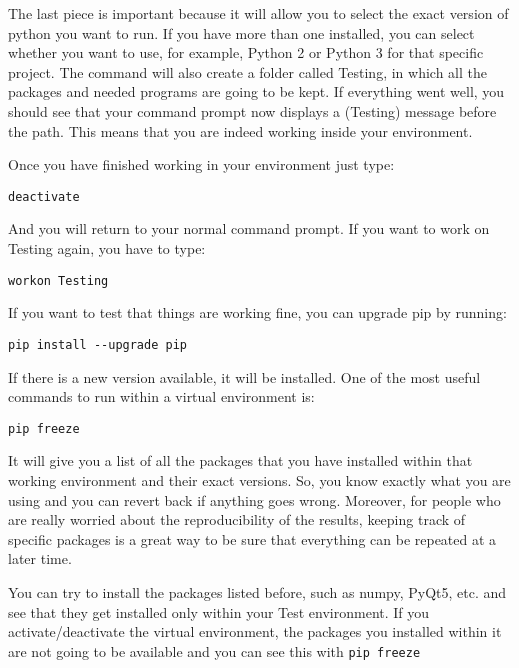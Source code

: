 The last piece is important because it will allow you to select the exact version of python you want to run. If you have more than one installed, you can select whether you want to use, for example, Python 2 or Python 3 for that specific project. The command will also create a folder called Testing, in which all the packages and needed programs are going to be kept. If everything went well, you should see that your command prompt now displays a (Testing) message before the path. This means that you are indeed working inside your environment.

Once you have finished working in your environment just type:

\begin{verbatim}
deactivate
\end{verbatim}

And you will return to your normal command prompt. If you want to work on Testing again, you have to type:

\begin{verbatim}
workon Testing
\end{verbatim}

If you want to test that things are working fine, you can upgrade pip by running:

\begin{verbatim}
pip install --upgrade pip
\end{verbatim}

If there is a new version available, it will be installed. One of the most useful commands to run within a virtual environment is:

\begin{verbatim}
pip freeze
\end{verbatim}

It will give you a list of all the packages that you have installed within that working environment and their exact versions. So, you know exactly what you are using and you can revert back if anything goes wrong. Moreover, for people who are really worried about the reproducibility of the results, keeping track of specific packages is a great way to be sure that everything can be repeated at a later time. 

You can try to install the packages listed before, such as numpy, PyQt5, etc. and see that they get installed only within your Test environment. If you activate/deactivate the virtual environment, the packages you installed within it are not going to be available and you can see this with \texttt{pip freeze}

